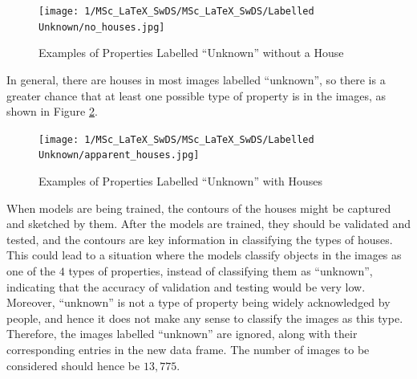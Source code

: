 \documentclass[11pt,twoside]{article}
\numberwithin{Theorem}{section}
\numberwithin{Definition}{section}
\numberwithin{Lemma}{section}
\numberwithin{Algorithm}{section}
\numberwithin{equation}{section}
\begin{document}
\begin{figure}[h]
\centering
\texttt{[image: 1/MSc\_LaTeX\_SwDS/MSc\_LaTeX\_SwDS/Labelled Unknown/no\_houses.jpg]}
\caption{Examples of Properties Labelled “Unknown” without a House}
\label{fig:unknown_green_road}
\end{figure}

In general, there are houses in most images labelled “unknown”, so there is a greater chance that at least one possible type of property is in the images, as shown in Figure \ref{fig:unknown_houses}. 

\begin{figure}[h]
\centering
\texttt{[image: 1/MSc\_LaTeX\_SwDS/MSc\_LaTeX\_SwDS/Labelled Unknown/apparent\_houses.jpg]}
\caption{Examples of Properties Labelled “Unknown” with Houses}
\label{fig:unknown_houses}
\end{figure}

When models are being trained, the contours of the houses might be captured and sketched by them. After the models are trained, they should be validated and tested, and the contours are key information in classifying the types of houses. This could lead to a situation where the models classify objects in the images as one of the $4$ types of properties, instead of classifying them as “unknown”, indicating that the accuracy of validation and testing would be very low. Moreover, “unknown” is not a type of property being widely acknowledged by people, and hence it does not make any sense to classify the images as this type. Therefore, the images labelled “unknown” are ignored, along with their corresponding entries in the new data frame. The number of images to be considered should hence be $13,775$.
\end{document}
